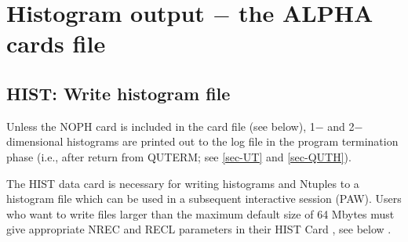  
 
 
\section{\label{sec-HISTO}Histogram output $-$ the ALPHA cards file}
 
\subsection{\label{sec-HISTW}HIST: Write histogram file}
\par
Unless the NOPH card is included in the card file (see below),
1$-$ and 2$-$dimensional histograms are printed out to the log
file in the program termination phase (i.e., after return from QUTERM;
see \ref{sec-UT} and \ref{sec-QUTH}).
 
The HIST data card is necessary for writing histograms and Ntuples
to a histogram file which can be used in a
subsequent interactive session (PAW). Users who want to write files larger
than the maximum default size of 64 Mbytes must give appropriate NREC and RECL parameters
in their HIST Card , see below  .
 
